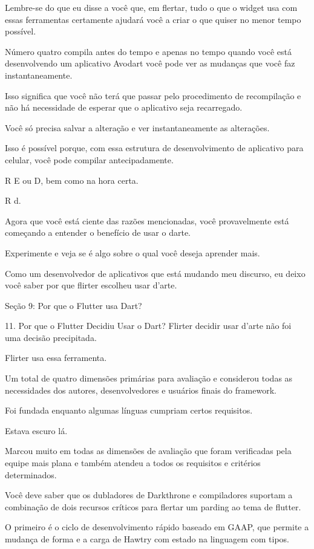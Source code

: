 Lembre-se do que eu disse a você que, em flertar, tudo o que o widget usa com essas ferramentas certamente ajudará você a criar o que quiser no menor tempo possível.

Número quatro compila antes do tempo e apenas no tempo quando você está desenvolvendo um aplicativo Avodart você pode ver as mudanças que você faz instantaneamente.

Isso significa que você não terá que passar pelo procedimento de recompilação e não há necessidade de esperar que o aplicativo seja recarregado.

Você só precisa salvar a alteração e ver instantaneamente as alterações.

Isso é possível porque, com essa estrutura de desenvolvimento de aplicativo para celular, você pode compilar antecipadamente.

R E ou D, bem como na hora certa.

R d.

Agora que você está ciente das razões mencionadas, você provavelmente está começando a entender o benefício de usar o darte.

Experimente e veja se é algo sobre o qual você deseja aprender mais.

Como um desenvolvedor de aplicativos que está mudando meu discurso, eu deixo você saber por que flirter escolheu usar d'arte.

Seção 9: Por que o Flutter usa Dart?

11. Por que o Flutter Decidiu Usar o Dart?
Flirter decidir usar d'arte não foi uma decisão precipitada.

Flirter usa essa ferramenta.

Um total de quatro dimensões primárias para avaliação e considerou todas as necessidades dos autores, desenvolvedores e usuários finais do framework.

Foi fundada enquanto algumas línguas cumpriam certos requisitos.

Estava escuro lá.

Marcou muito em todas as dimensões de avaliação que foram verificadas pela equipe mais plana e também atendeu a todos os requisitos e critérios determinados.

Você deve saber que os dubladores de Darkthrone e compiladores suportam a combinação de dois recursos críticos para flertar um parding ao tema de flutter.

O primeiro é o ciclo de desenvolvimento rápido baseado em GAAP, que permite a mudança de forma e a carga de Hawtry com estado na linguagem com tipos.

